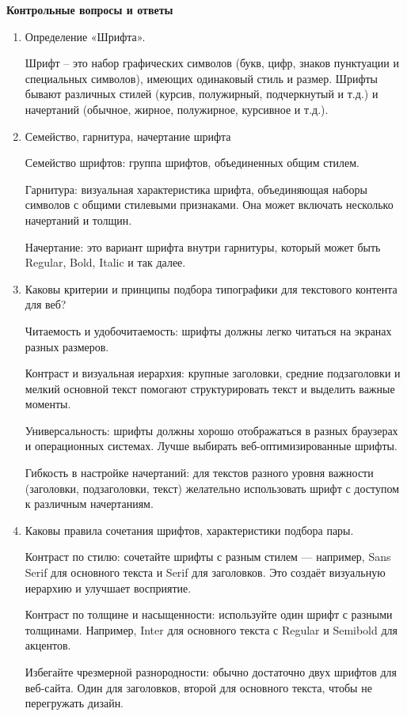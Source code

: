 \textbf{Контрольные вопросы и ответы}

\begin{enumerate}
    \item Определение «Шрифта».

Шрифт – это набор графических символов (букв, цифр, знаков пунктуации и специальных символов), имеющих одинаковый стиль и размер. Шрифты бывают различных стилей (курсив, полужирный, подчеркнутый и т.д.) и начертаний (обычное, жирное, полужирное, курсивное и т.д.).

    \item Семейство, гарнитура, начертание шрифта

Семейство шрифтов: группа шрифтов, объединенных общим стилем.

Гарнитура: визуальная характеристика шрифта, объединяющая наборы символов с общими стилевыми признаками. Она может включать несколько начертаний и толщин.

Начертание: это вариант шрифта внутри гарнитуры, который может быть Regular, Bold, Italic и так далее.

\item Каковы критерии и принципы подбора типографики для текстового контента для веб?

Читаемость и удобочитаемость: шрифты должны легко читаться на экранах разных размеров.

Контраст и визуальная иерархия: крупные заголовки, средние подзаголовки и мелкий основной текст помогают структурировать текст и выделить важные моменты.

Универсальность: шрифты должны хорошо отображаться в разных браузерах и операционных системах. Лучше выбирать веб-оптимизированные шрифты.

Гибкость в настройке начертаний: для текстов разного уровня важности (заголовки, подзаголовки, текст) желательно использовать шрифт с доступом к различным начертаниям.

\item Каковы правила сочетания шрифтов, характеристики подбора пары.

    Контраст по стилю: сочетайте шрифты с разным стилем — например, Sans Serif для основного текста и Serif для заголовков. Это создаёт визуальную иерархию и улучшает восприятие.

    Контраст по толщине и насыщенности: используйте один шрифт с разными толщинами. Например, Inter для основного текста с Regular и Semibold для акцентов.

    Избегайте чрезмерной разнородности: обычно достаточно двух шрифтов для веб-сайта. Один для заголовков, второй для основного текста, чтобы не перегружать дизайн.


\end{enumerate}
